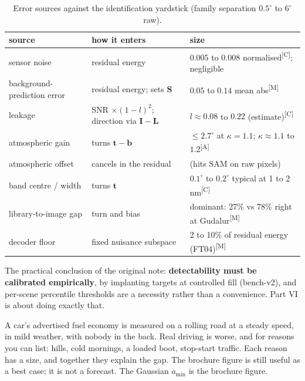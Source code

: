 \documentclass[11pt,a4paper,oneside,openany]{book}
\newcommand{\B}[1]{{\symbf{#1}}}
\newcommand{\B}[1]{{\bm{#1}}}
\newcommand{\meas}{\textsuperscript{\textsf{\scriptsize[M]}}}
\newcommand{\comp}{\textsuperscript{\textsf{\scriptsize[C]}}}
\newcommand{\assm}{\textsuperscript{\textsf{\scriptsize[A]}}}
\newcommand{\vt}{\B{t}}
\newcommand{\vb}{\B{b}}
\newcommand{\mS}{\B{S}}
\newcommand{\mL}{\B{L}}
\newcommand{\mI}{\B{I}}
\begin{document}
\begin{table}[ht]
\centering\small
\caption{Error sources against the identification yardstick (family separation $0.5^\circ$ to $6^\circ$ raw).}
\label{tab:errors}
\begin{tabularx}{\textwidth}{@{}lXl@{}}
\toprule
source & how it enters & size\\
\midrule
sensor noise & residual energy & $0.005$ to $0.008$ normalised\comp; negligible\\
background-prediction error & residual energy; sets $\mS$ & $0.05$ to $0.14$ mean abs\meas\\
leakage & SNR $\times(1-l)^2$; direction via $\mI-\mL$ & $l\approx0.08$ to $0.22$ (estimate)\comp\\
atmospheric gain & turns $\vt-\vb$ & $\le2.7^\circ$ at $\kappa=1.1$; $\kappa\approx1.1$ to $1.2$\assm\\
atmospheric offset & cancels in the residual & (hits SAM on raw pixels)\\
band centre / width & turns $\vt$ & $0.1^\circ$ to $0.2^\circ$ typical at 1 to 2\,nm\comp\\
library-to-image gap & turn and bias & dominant: 27\% vs 78\% right at Gudalur\meas\\
decoder floor & fixed nuisance subspace & 2 to 10\% of residual energy (FT04)\meas\\
\bottomrule
\end{tabularx}
\end{table}

The practical conclusion of the original note: \textbf{detectability must be calibrated empirically}, by implanting targets at controlled fill (bench-v2), and per-scene
percentile thresholds are a necessity rather than a convenience. Part VI is about doing exactly that.

\begin{analogy}
A car's advertised fuel economy is measured on a rolling road at a steady speed, in mild weather, with nobody in the back. Real driving is worse, and for reasons you
can list: hills, cold mornings, a loaded boot, stop-start traffic. Each reason has a size, and together they explain the gap. The brochure figure is still useful as a
best case; it is not a forecast. The Gaussian $a_{\min}$ is the brochure figure.
\end{analogy}
\end{document}
